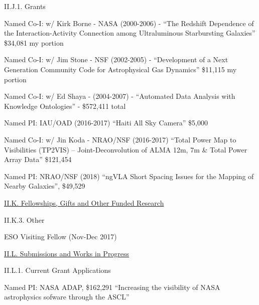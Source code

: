 \documentclass[11pt,letterpaper]{article}
\begin{document}
II.J.1. Grants

Named Co-I:  w/ Kirk Borne - NASA (2000-2006) - ``The Redshift Dependence of the Interaction-Activity Connection
    among Ultraluminous Starbursting Galaxies''
    \$34,081 my portion

Named Co-I:  w/ Jim Stone - NSF (2002-2005)  - ``Development of a Next Generation Community Code
   for Astrophysical Gas Dynamics''
   \$11,115 my portion

Named Co-I:  w/ Ed Shaya - (2004-2007) - ``Automated Data Analysis with Knowledge Ontologies'' -
      \$572,411 total     %


Named PI: IAU/OAD (2016-2017) ``Haiti All Sky Camera''
		\$5,000

Named Co-I: w/ Jin Koda - NRAO/NSF (2016-2017)
``Total Power Map to Visibilities (TP2VIS) -- Joint-Deconvolution of ALMA 12m, 7m \& Total Power Array Data''
		\$121,454 

Named PI: NRAO/NSF (2018)
``ngVLA Short Spacing Issues for the Mapping of Nearby Galaxies'',
\$49,529




\underline{II.K. Fellowships, Gifts and Other Funded Research}




II.K.3. Other

ESO Visiting Fellow (Nov-Dec 2017)



\underline{II.L. Submissions and Works in Progress}


II.L.1. Current Grant Applications

Named PI: NASA ADAP, \$162,291
``Increasing the visibility of NASA astrophysics sofware through the ASCL''









\end{document}
